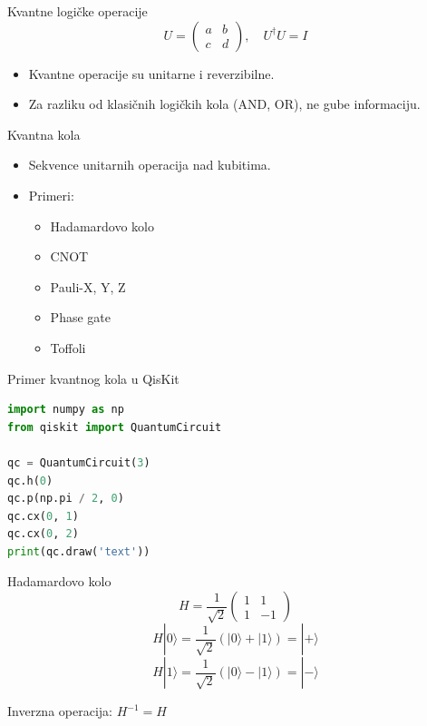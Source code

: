 \documentclass[aspectratio=169]{beamer}
\begin{document}
\begin{frame}{Kvantne logičke operacije}
\[
U = \begin{pmatrix} a & b \\ c & d \end{pmatrix}, \quad U^\dagger U = I
\]
\begin{itemize}
    \item Kvantne operacije su unitarne i reverzibilne.
    \item Za razliku od klasičnih logičkih kola (AND, OR), ne gube informaciju.
\end{itemize}
\end{frame}

\begin{frame}{Kvantna kola}
\begin{itemize}
    \item Sekvence unitarnih operacija nad kubitima.
    \item Primeri:
    \begin{itemize}
        \item Hadamardovo kolo
        \item CNOT
        \item Pauli-X, Y, Z
        \item Phase gate
        \item Toffoli
    \end{itemize}
\end{itemize}
\end{frame}

\begin{frame}[fragile]{Primer kvantnog kola u QisKit}
\begin{lstlisting}[language=Python]
import numpy as np
from qiskit import QuantumCircuit

qc = QuantumCircuit(3)
qc.h(0)
qc.p(np.pi / 2, 0)
qc.cx(0, 1)
qc.cx(0, 2)
print(qc.draw('text'))
\end{lstlisting}
\end{frame}

\begin{frame}{Hadamardovo kolo}
\[
H = \frac{1}{\sqrt{2}} \begin{pmatrix} 1 & 1 \\ 1 & -1 \end{pmatrix}
\]
\[
H|0\rangle = \frac{1}{\sqrt{2}}(|0\rangle + |1\rangle) = |+\rangle
\]
\[
H|1\rangle = \frac{1}{\sqrt{2}}(|0\rangle - |1\rangle) = |-\rangle
\]


Inverzna operacija: $H^{-1} = H$
\end{frame}
\end{document}
